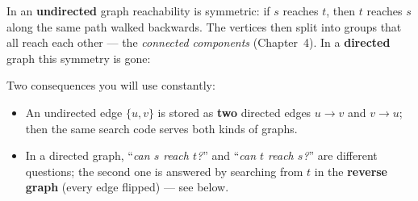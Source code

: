 In an \textbf{undirected} graph reachability is symmetric: if $s$ reaches $t$, then $t$ reaches $s$ along the same path walked backwards. The vertices then split into groups that all reach each other --- the \emph{connected components} (Chapter~4). In a \textbf{directed} graph this symmetry is gone:

\begin{diagrambox}
\end{diagrambox}

Two consequences you will use constantly:
\begin{itemize}[leftmargin=*]
    \item An undirected edge $\{u,v\}$ is stored as \textbf{two} directed edges $u\to v$ and $v \to u$; then the same search code serves both kinds of graphs.
    \item In a directed graph, ``\emph{can $s$ reach $t$?}'' and ``\emph{can $t$ reach $s$?}'' are different questions; the second one is answered by searching from $t$ in the \textbf{reverse graph} (every edge flipped) --- see below.
\end{itemize}


